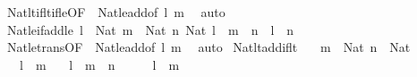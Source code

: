 \begin{isabellebody}
\ Nat{\isacharunderscore}{\kern0pt}lt{\isacharunderscore}{\kern0pt}if{\isacharunderscore}{\kern0pt}lt{\isacharunderscore}{\kern0pt}if{\isacharunderscore}{\kern0pt}le{\isacharbrackleft}{\kern0pt}OF\ {\isacharunderscore}{\kern0pt}\ Nat{\isacharunderscore}{\kern0pt}le{\isacharunderscore}{\kern0pt}add{\isacharbrackleft}{\kern0pt}of\ l\ m{\isacharbrackright}{\kern0pt}{\isacharbrackright}{\kern0pt}\ \isamarkupfalse%
\ auto%
\endisatagproof
{\isafoldproof}%
%
\isadelimproof
\isanewline
%
\endisadelimproof
\isanewline
{}\isamarkupfalse%
\ Nat{\isacharunderscore}{\kern0pt}le{\isacharunderscore}{\kern0pt}if{\isacharunderscore}{\kern0pt}add{\isacharunderscore}{\kern0pt}le{\isacharcolon}{\kern0pt}\ {\isachardoublequoteopen}{\isasymlbrakk}l\ {\isacharcolon}{\kern0pt}\ Nat{\isacharsemicolon}{\kern0pt}\ m\ {\isacharcolon}{\kern0pt}\ Nat{\isacharsemicolon}{\kern0pt}\ n{\isacharcolon}{\kern0pt}\ Nat{\isacharsemicolon}{\kern0pt}\ l\ {\isacharplus}{\kern0pt}\ m\ {\isasymle}\ n{\isasymrbrakk}\ {\isasymLongrightarrow}\ l\ {\isasymle}\ n{\isachardoublequoteclose}\isanewline
%
\isadelimproof
\ \ %
\endisadelimproof
%
\isatagproof
{}\isamarkupfalse%
\ Nat{\isacharunderscore}{\kern0pt}le{\isacharunderscore}{\kern0pt}trans{\isacharbrackleft}{\kern0pt}OF\ {\isacharunderscore}{\kern0pt}\ Nat{\isacharunderscore}{\kern0pt}le{\isacharunderscore}{\kern0pt}add{\isacharbrackleft}{\kern0pt}of\ l\ m{\isacharbrackright}{\kern0pt}{\isacharbrackright}{\kern0pt}\ \isamarkupfalse%
\ auto%
\endisatagproof
{\isafoldproof}%
%
\isadelimproof
\isanewline
%
\endisadelimproof
\isanewline
{}\isamarkupfalse%
\ Nat{\isacharunderscore}{\kern0pt}lt{\isacharunderscore}{\kern0pt}add{\isacharunderscore}{\kern0pt}if{\isacharunderscore}{\kern0pt}lt{\isacharcolon}{\kern0pt}\isanewline
\ \ \ {\isachardoublequoteopen}m\ {\isacharcolon}{\kern0pt}\ Nat{\isachardoublequoteclose}\ {\isachardoublequoteopen}n\ {\isacharcolon}{\kern0pt}\ Nat{\isachardoublequoteclose}\isanewline
\ \ \ {\isachardoublequoteopen}l\ {\isacharless}{\kern0pt}\ m{\isachardoublequoteclose}\isanewline
\ \ \ {\isachardoublequoteopen}l\ {\isacharless}{\kern0pt}\ m\ {\isacharplus}{\kern0pt}\ n{\isachardoublequoteclose}\isanewline
%
\isadelimproof
%
\endisadelimproof
%
\isatagproof
{}\isamarkupfalse%
\ {\isacharminus}{\kern0pt}\isanewline
\ \ \isamarkupfalse%
\ {\isacartoucheopen}l\ {\isacharless}{\kern0pt}\ m{\isacartoucheclose}\isanewline
\ \ \isamarkupfalse%
\ \isamarkupfalse%

\end{isabellebody}
